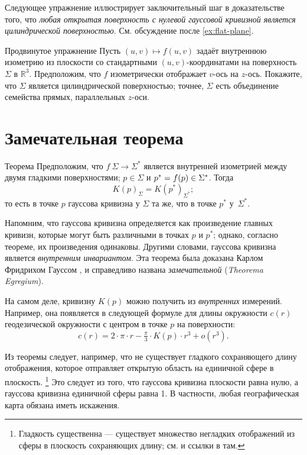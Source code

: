 Следующее упражнение иллюстрирует заключительный шаг в доказательстве того, что \textit{любая открытая поверхность с нулевой гауссовой кривизной является цилиндрической поверхностью}.
См. обсуждение после \ref{ex:flat-plane}.

\begin{thm}{Продвинутое упражнение}\label{ex:line-cylinder} 
Пусть $(u,v)\mapsto f(u,v)$ задаёт внутреннюю изометрию из плоскости со стандартными $(u,v)$-координатами на поверхность $\Sigma$ в $\mathbb{R}^3$.
Предположим, что $f$ изометрически отображает $v$-ось на $z$-ось.
Покажите, что $\Sigma$ является цилиндрической поверхностью;
точнее, $\Sigma$ есть объединение семейства прямых, параллельных $z$-оси.
\end{thm}

\section{Замечательная теорема}

\begin{thm}{Теорема}\label{thm:remarkable}
Предположим, что $f\:\Sigma\to \Sigma^{*}$ является внутренней изометрией между двумя гладкими поверхностями; $p\in \Sigma$ и $p^{*}\z=f(p)\in \Sigma^{*}$.
Тогда 
\[K(p)_{\Sigma}=K(p^{*})_{\Sigma^{*}};\]
то есть в точке $p$ гауссова кривизна у $\Sigma$ та же, что в точке $p^{*}$ у~$\Sigma^{*}$.
\end{thm}

Напомним, что гауссова кривизна определяется как произведение главных кривизн, которые могут быть различными в точках $p$ и $p^*$; однако, согласно теореме, их произведения одинаковы.
Другими словами, гауссова кривизна является \textit{внутренним инвариантом}.
Эта теорема была доказана Карлом Фридрихом Гауссом \cite{gauss}, и справедливо названа {}\emph{замечательной} ({}\emph{Theorema Egregium}).

На самом деле, кривизну $K(p)$ можно получить из \textit{внутренних} измерений.
Например, она появляется в следующей формуле для длины окружности $c(r)$ геодезической окружности с центром в точке $p$ на поверхности: 
\[c(r)=2\cdot\pi\cdot r-\tfrac\pi3\cdot K(p)\cdot r^3+o(r^3).\]

Из теоремы следует, например, что не существует гладкого сохраняющего длину отображения, которое отправляет открытую область на единичной сфере в плоскость.%
\footnote{Гладкость существенна --- существует множество негладких отображений из сферы в плоскость сохраняющих длину; см. \cite{petrunin-yashinski} и ссылки в там.}
Это следует из того, что гауссова кривизна плоскости равна нулю, а гауссова кривизна единичной сферы равна 1.
В частности, любая географическая карта обязана иметь искажения.


